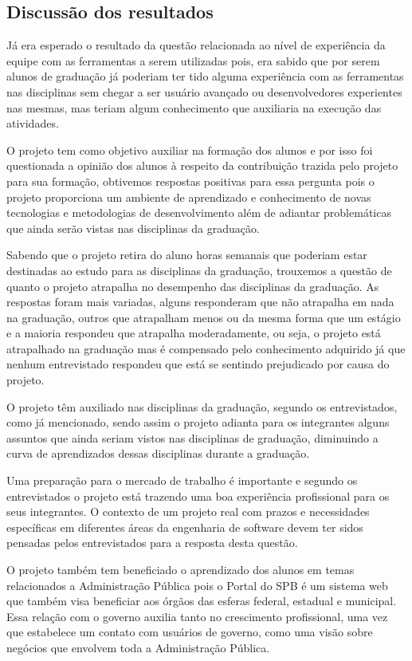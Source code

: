 \subsection{Discussão dos resultados}

Já era esperado o resultado da questão relacionada ao nível de experiência da equipe com as ferramentas a serem utilizadas pois, era sabido que por serem alunos de graduação já poderiam ter tido alguma experiência com as ferramentas nas disciplinas sem chegar a ser usuário avançado ou desenvolvedores experientes nas mesmas, mas teriam algum conhecimento que auxiliaria na execução das atividades.

O projeto tem como objetivo auxiliar na formação dos alunos e por isso foi questionada a opinião dos alunos à respeito da contribuição trazida pelo projeto para sua formação, obtivemos respostas positivas para essa pergunta pois o projeto proporciona um ambiente de aprendizado e conhecimento de novas tecnologias e metodologias de desenvolvimento além de adiantar problemáticas que ainda serão vistas nas disciplinas da graduação.

Sabendo que o projeto retira do aluno horas semanais que poderiam estar destinadas ao estudo para as disciplinas da graduação, trouxemos a questão de quanto o projeto atrapalha no desempenho das disciplinas da graduação. As respostas foram mais variadas, alguns responderam que não atrapalha em nada na graduação, outros que atrapalham menos ou da mesma forma que um estágio e a maioria respondeu que atrapalha moderadamente, ou seja, o projeto está atrapalhado na graduação mas é compensado pelo conhecimento adquirido já que nenhum entrevistado respondeu que está se sentindo prejudicado por causa do projeto.

O projeto têm auxiliado nas disciplinas da graduação, segundo os entrevistados, como já mencionado, sendo assim o projeto adianta para os integrantes alguns assuntos que ainda seriam vistos nas disciplinas de graduação, diminuindo a curva de aprendizados dessas disciplinas durante a graduação.

Uma preparação para o mercado de trabalho é importante e segundo os entrevistados o projeto está trazendo uma boa experiência profissional para os seus integrantes. O contexto de um projeto real com prazos e necessidades específicas em diferentes áreas da engenharia de software devem ter sidos pensadas pelos entrevistados para a resposta desta questão. 

O projeto também tem beneficiado o aprendizado dos alunos em temas relacionados a Administração Pública pois o Portal do SPB é um sistema web que também visa beneficiar aos órgãos das esferas federal, estadual e municipal. Essa relação com o governo auxilia tanto no crescimento profissional, uma vez que estabelece um contato com usuários de governo, como uma visão sobre negócios que envolvem toda a Administração Pública.
